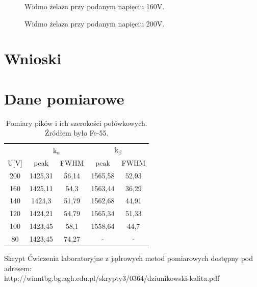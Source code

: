 \documentclass[11pt,a4paper]{article}
\begin{document}
\begin{figure}[H]
\centering
\resizebox{.8\linewidth}{!}{}
\caption{Widmo żelaza przy podanym napięciu 160V.}
\label{fig1}
\end{figure}

\begin{figure}[H]
\centering
\resizebox{.8\linewidth}{!}{}
\caption{Widmo żelaza przy podanym napięciu 200V.}
\label{fig1}
\end{figure}

\section{Wnioski}

\section{Dane pomiarowe}

\begin{longtable}{c|cc|cc}
	\caption{Pomiary pików i ich szerokości połówkowych. Źródłem było Fe-55.}\\
\label{dt2}
 &\multicolumn{2}{c|}{k$_{\alpha}$}	&\multicolumn{2}{c}{k$_{\beta}$} \\
U[V]	&peak	&FWHM	&peak	&FWHM\\ \hline
\endhead
200	&1425,31	&56,14	&1565,58	&52,93 \\
160	&1425,11	&54,3	&1563,44	&36,29 \\
140	&1424,3		&51,79	&1562,68	&44,91 \\
120	&1424,21	&54,79	&1565,34	&51,33 \\
100	&1423,45	&58,1	&1558,64	&44,7 \\
80	&1423,45	&74,27	&-	&- \\
\end{longtable}

\begin{thebibliography}{9}
Skrypt Ćwiczenia laboratoryjne z jądrowych metod pomiarowych dostępny pod adresem:\\http://winntbg.bg.agh.edu.pl/skrypty3/0364/dziunikowski-kalita.pdf 
\end{thebibliography}
\end{document}
